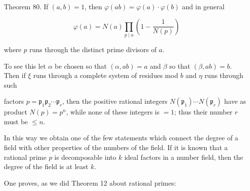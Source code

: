 Theorem 80. If $(a, b) = 1$, then $\varphi(a b) = \varphi(a) \cdot \varphi(b)$ and in general

$$\varphi(a) = N(a) \prod_{p \mid a} \left(1 - \frac{1}{N(p)}\right)$$

where $p$ runs through the distinct prime divisors of $a$.

To see this let $\alpha$ be chosen so that $(\alpha, a b) = a$ and $\beta$ so that $(\beta, a b) = b$. Then if $\xi$ runs through a complete system of residues mod $b$ and $\eta$ runs through such

factors $p = \mathfrak{p}_1 \mathfrak{p}_2 \cdots \mathfrak{p}_r$, then the positive rational integers $N(\mathfrak{p}_1) \cdots N(\mathfrak{p}_r)$ have as product $N(p) = p^n$, while none of these integers is $= 1$; thus their number $r$ must be $\leq n$.

In this way we obtain one of the few statements which connect the degree of a field with other properties of the numbers of the field. If it is known that a rational prime $p$ is decomposable into $k$ ideal factors in a number field, then the degree of the field is at least $k$.

One proves, as we did Theorem 12 about rational primes:

